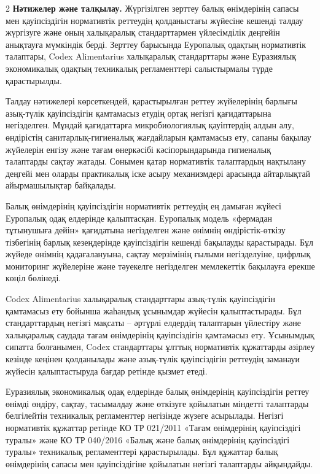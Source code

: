 \begin{multicols}{2}
{\bfseries Нәтижелер және талқылау.} Жүргізілген зерттеу балық өнімдерінің
сапасы мен қауіпсіздігін нормативтік реттеудің қолданыстағы жүйесіне
кешенді талдау жүргізуге және оның халықаралық стандарттармен
үйлесімділік деңгейін анықтауға мүмкіндік берді. Зерттеу барысында
Еуропалық одақтың нормативтік талаптары, Codex Alimentarius халықаралық
стандарттары және Еуразиялық экономикалық одақтың техникалық
регламенттері салыстырмалы түрде қарастырылды.

Талдау нәтижелері көрсеткендей, қарастырылған реттеу жүйелерінің барлығы
азық-түлік қауіпсіздігін қамтамасыз етудің ортақ негізгі қағидаттарына
негізделген. Мұндай қағидаттарға микробиологиялық қауіптердің алдын алу,
өндірістің санитарлық-гигиеналық жағдайларын қамтамасыз ету, сапаны
бақылау жүйелерін енгізу және тағам өнеркәсібі кәсіпорындарында
гигиеналық талаптарды сақтау жатады. Сонымен қатар нормативтік
талаптардың нақтылану деңгейі мен оларды практикалық іске асыру
механизмдері арасында айтарлықтай айырмашылықтар байқалады.

Балық өнімдерінің қауіпсіздігін нормативтік реттеудің ең дамыған жүйесі
Еуропалық одақ елдерінде қалыптасқан. Еуропалық модель «фермадан
тұтынушыға дейін» қағидатына негізделген және өнімнің өндірістік-өткізу
тізбегінің барлық кезеңдерінде қауіпсіздігін кешенді бақылауды
қарастырады. Бұл жүйеде өнімнің қадағалануына, сақтау мерзімінің ғылыми
негізделуіне, цифрлық мониторинг жүйелеріне және тәуекелге негізделген
мемлекеттік бақылауға ерекше көңіл бөлінеді.

Codex Alimentarius халықаралық стандарттары азық-түлік қауіпсіздігін
қамтамасыз ету бойынша жаһандық ұсынымдар жүйесін қалыптастырады. Бұл
стандарттардың негізгі мақсаты -- әртүрлі елдердің талаптарын үйлестіру
және халықаралық саудада тағам өнімдерінің қауіпсіздігін қамтамасыз ету.
Ұсынымдық сипатта болғанымен, Codex стандарттары ұлттық нормативтік
құжаттарды әзірлеу кезінде кеңінен қолданылады және азық-түлік
қауіпсіздігін реттеудің заманауи жүйесін қалыптастыруда бағдар ретінде
қызмет етеді.

Еуразиялық экономикалық одақ елдерінде балық өнімдерінің қауіпсіздігін
реттеу өнімді өндіру, сақтау, тасымалдау және өткізуге қойылатын
міндетті талаптарды белгілейтін техникалық регламенттер негізінде жүзеге
асырылады. Негізгі нормативтік құжаттар ретінде КО ТР 021/2011 «Тағам
өнімдерінің қауіпсіздігі туралы» және КО ТР 040/2016 «Балық және балық
өнімдерінің қауіпсіздігі туралы» техникалық регламенттері қарастырылады.
Бұл құжаттар балық өнімдерінің сапасы мен қауіпсіздігіне қойылатын
негізгі талаптарды айқындайды.


\end{multicols}
